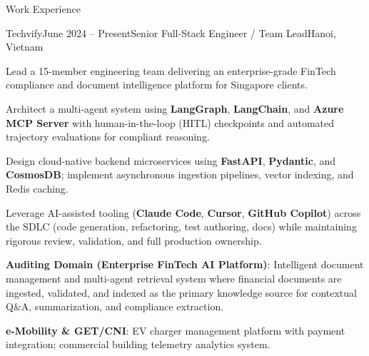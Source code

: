 \documentclass{resume}
\begin{document}
  \begin{rSection}{Work Experience}
    \begin{rSubsection}{Techvify}{June 2024 -- Present}{Senior Full-Stack Engineer / Team Lead}{Hanoi, Vietnam}
      \item Lead a 15-member engineering team delivering an enterprise-grade FinTech compliance and document intelligence platform for Singapore clients.
      \item Architect a multi-agent system using \textbf{LangGraph}, \textbf{LangChain}, and \textbf{Azure MCP Server} with human-in-the-loop (HITL) checkpoints and automated trajectory evaluations for compliant reasoning.
      \item Design cloud-native backend microservices using \textbf{FastAPI}, \textbf{Pydantic}, and \textbf{CosmosDB}; implement asynchronous ingestion pipelines, vector indexing, and Redis caching.
      \item Leverage AI-assisted tooling (\textbf{Claude Code}, \textbf{Cursor}, \textbf{GitHub Copilot}) across the SDLC (code generation, refactoring, test authoring, docs) while maintaining rigorous review, validation, and full production ownership.
      \rProjectsHeader
      \item \textbf{Auditing Domain (Enterprise FinTech AI Platform)}: Intelligent document management and multi-agent retrieval system where financial documents are ingested, validated, and indexed as the primary knowledge source for contextual Q\&A, summarization, and compliance extraction.
      \item \textbf{e-Mobility \& GET/CNI}: EV charger management platform with payment integration; commercial building telemetry analytics system.
    \end{rSubsection}
  \end{rSection}

  \newpage
\end{document}
